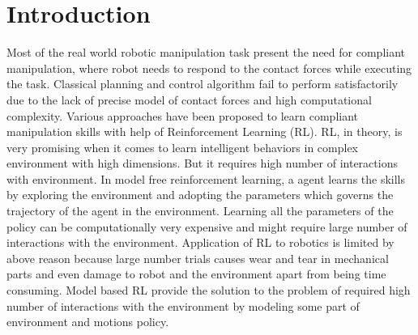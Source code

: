 \documentclass[thesis]{mas_proposal}
\begin{document}
\chapter{Introduction}
Most of the real world robotic manipulation task present the need for compliant manipulation, where robot needs to respond to the contact forces while executing the task. Classical planning and control algorithm fail to perform satisfactorily due to the lack of precise model of contact forces and high computational complexity. Various approaches have been proposed to learn compliant manipulation skills with help of Reinforcement Learning (RL). RL, in theory, is very promising when it comes to learn intelligent behaviors in complex environment with high dimensions. But it requires high number of interactions with environment. In model free reinforcement learning, a agent learns the skills by exploring the environment and adopting the parameters which governs the trajectory of the agent in the environment. Learning all the parameters of the policy can be computationally very expensive and might require large number of interactions with the environment. Application of RL to robotics is limited by above reason because large number trials causes wear and tear in mechanical parts and even damage to robot and the environment apart from being time consuming. Model based RL provide the solution to the problem of required high number of interactions with the environment by modeling some part of environment and motions policy. 
\end{document}
